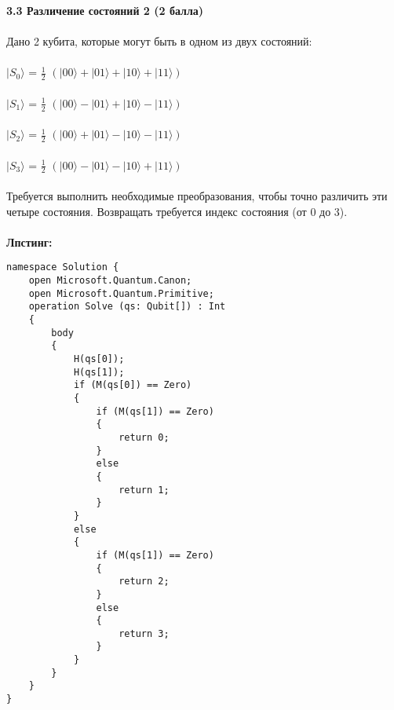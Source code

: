 \documentclass{article}
\begin{document}
\textbf{\Large 3.3 Различение состояний 2 (2 балла)}\\\\
\hfill \break
Дано 2 кубита, которые могут быть в одном из двух состояний:\\\\
\(|S_0\rangle\) = \(\frac{1}{2}\) \((|00\rangle + |01\rangle + |10\rangle + |11\rangle)\)\\\\
\(|S_1\rangle\) = \(\frac{1}{2}\) \((|00\rangle - |01\rangle + |10\rangle - |11\rangle)\)\\\\
\(|S_2\rangle\) = \(\frac{1}{2}\) \((|00\rangle + |01\rangle - |10\rangle - |11\rangle)\)\\\\
\(|S_3\rangle\) = \(\frac{1}{2}\) \((|00\rangle - |01\rangle - |10\rangle + |11\rangle)\)\\\\
Требуется выполнить необходимые преобразования, чтобы точно различить эти четыре состояния. Возвращать требуется индекс состояния (от 0 до 3).\\\\
\textbf{Лпстинг:}\\
\begin{lstlisting}
namespace Solution {
    open Microsoft.Quantum.Canon;
    open Microsoft.Quantum.Primitive;
    operation Solve (qs: Qubit[]) : Int
    {
        body 
        {
			H(qs[0]);
			H(qs[1]);
			if (M(qs[0]) == Zero) 
			{
				if (M(qs[1]) == Zero)
				{
					return 0;
				}
				else
				{
					return 1;
				}
			}
			else
			{
				if (M(qs[1]) == Zero)
				{
					return 2;
				}
				else
				{
					return 3;
				}
			}
        }
    }
}
\end{lstlisting}
\end{document}
